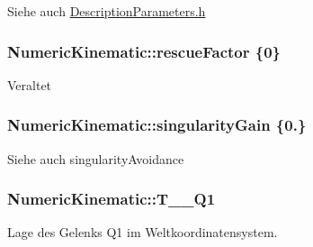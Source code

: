 \begin{DoxySeeAlso}{Siehe auch}
\hyperlink{DescriptionParameters_8h_source}{Description\-Parameters.\-h} 
\end{DoxySeeAlso}
\hypertarget{classNumericKinematic_a6691d8d0fa2579cc4408acec0d2e864b}{
\subsubsection[{rescue\-Factor}]{\setlength{\rightskip}{0pt plus 5cm}Numeric\-Kinematic\-::rescue\-Factor \{0\}\hspace{0.3cm}{\ttfamily [private]}}}\label{classNumericKinematic_a6691d8d0fa2579cc4408acec0d2e864b}
\begin{DoxyRefDesc}{Veraltet}
\item[\hyperlink{deprecated__deprecated000005}{Veraltet}]\end{DoxyRefDesc}
\hypertarget{classNumericKinematic_ab64580c565b5ddcadb7de6fc6d5bd766}{
\subsubsection[{singularity\-Gain}]{\setlength{\rightskip}{0pt plus 5cm}Numeric\-Kinematic\-::singularity\-Gain \{0.\}\hspace{0.3cm}{\ttfamily [private]}}}\label{classNumericKinematic_ab64580c565b5ddcadb7de6fc6d5bd766}
\begin{DoxySeeAlso}{Siehe auch}
singularity\-Avoidance 
\end{DoxySeeAlso}
\hypertarget{classNumericKinematic_a2b3815e7cce36ab203257bf8f5e2e236}{
\subsubsection[{T\-\_\-0\-\_\-\-Q1}]{\setlength{\rightskip}{0pt plus 5cm}Numeric\-Kinematic\-::\-T\-\_\-\_\-\-Q1\hspace{0.3cm}{\ttfamily [private]}}}\label{classNumericKinematic_a2b3815e7cce36ab203257bf8f5e2e236}


Lage des Gelenks Q1 im Weltkoordinatensystem. 

